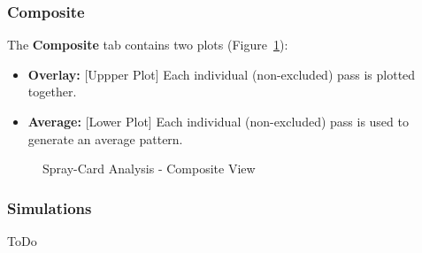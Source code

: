 \documentclass[10pt,letterpaper,titlepage]{article}
\begin{document}
    \subsubsection{Composite}
    The \textbf{Composite} tab contains two plots (Figure~\ref{fig:card_composite}):
    \begin{itemize}
        \item \textbf{Overlay:} [Uppper Plot] Each individual (non-excluded) pass is plotted together.
        \item \textbf{Average:} [Lower Plot] Each individual (non-excluded) pass is used to generate an average pattern.
    \end{itemize}
    \begin{figure}[hb]
        \centering
        \caption{Spray-Card Analysis - Composite View}
        \label{fig:card_composite}
    \end{figure}
    \FloatBarrier
    \newpage

    \subsubsection{Simulations}
    \color{red} ToDo \color{black}
    \newpage
\end{document}

